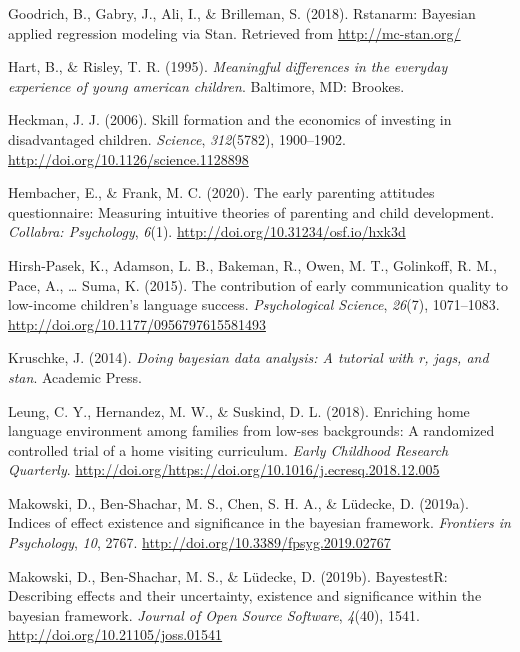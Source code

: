 \documentclass[man,floatsintext]{apa6}
\begin{document}
\leavevmode\hypertarget{ref-rstanarm}{}%
Goodrich, B., Gabry, J., Ali, I., \& Brilleman, S. (2018). Rstanarm: Bayesian applied regression modeling via Stan. Retrieved from \url{http://mc-stan.org/}

\leavevmode\hypertarget{ref-Hart1995}{}%
Hart, B., \& Risley, T. R. (1995). \emph{Meaningful differences in the everyday experience of young american children}. Baltimore, MD: Brookes.

\leavevmode\hypertarget{ref-Heckman2006}{}%
Heckman, J. J. (2006). Skill formation and the economics of investing in disadvantaged children. \emph{Science}, \emph{312}(5782), 1900--1902. \url{http://doi.org/10.1126/science.1128898}

\leavevmode\hypertarget{ref-Hembacher2020}{}%
Hembacher, E., \& Frank, M. C. (2020). The early parenting attitudes questionnaire: Measuring intuitive theories of parenting and child development. \emph{Collabra: Psychology}, \emph{6}(1). \url{http://doi.org/10.31234/osf.io/hxk3d}

\leavevmode\hypertarget{ref-HirshPasek2015}{}%
Hirsh-Pasek, K., Adamson, L. B., Bakeman, R., Owen, M. T., Golinkoff, R. M., Pace, A., \ldots{} Suma, K. (2015). The contribution of early communication quality to low-income children's language success. \emph{Psychological Science}, \emph{26}(7), 1071--1083. \url{http://doi.org/10.1177/0956797615581493}

\leavevmode\hypertarget{ref-Kruschke2014}{}%
Kruschke, J. (2014). \emph{Doing bayesian data analysis: A tutorial with r, jags, and stan}. Academic Press.

\leavevmode\hypertarget{ref-Leung2018}{}%
Leung, C. Y., Hernandez, M. W., \& Suskind, D. L. (2018). Enriching home language environment among families from low-ses backgrounds: A randomized controlled trial of a home visiting curriculum. \emph{Early Childhood Research Quarterly}. \url{http://doi.org/https://doi.org/10.1016/j.ecresq.2018.12.005}

\leavevmode\hypertarget{ref-Makowski2019}{}%
Makowski, D., Ben-Shachar, M. S., Chen, S. H. A., \& Lüdecke, D. (2019a). Indices of effect existence and significance in the bayesian framework. \emph{Frontiers in Psychology}, \emph{10}, 2767. \url{http://doi.org/10.3389/fpsyg.2019.02767}

\leavevmode\hypertarget{ref-bayestestR}{}%
Makowski, D., Ben-Shachar, M. S., \& Lüdecke, D. (2019b). BayestestR: Describing effects and their uncertainty, existence and significance within the bayesian framework. \emph{Journal of Open Source Software}, \emph{4}(40), 1541. \url{http://doi.org/10.21105/joss.01541}
\end{document}
